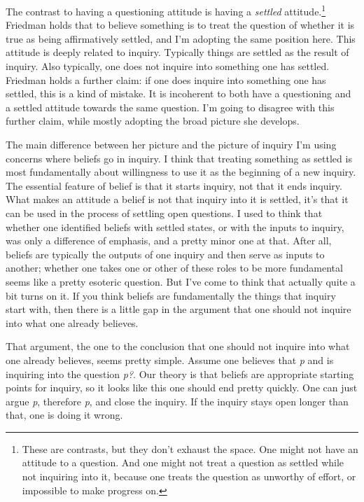 \documentclass[
  12pt,
  letterpaper,
]{scrbook}
\begin{document}
The contrast to having a questioning attitude is having a \emph{settled}
attitude.\footnote{These are contrasts, but they don't exhaust the
  space. One might not have an attitude to a question. And one might not
  treat a question as settled while not inquiring into it, because one
  treats the question as unworthy of effort, or impossible to make
  progress on.} Friedman holds that to believe something is to treat the
question of whether it is true as being affirmatively settled, and I'm
adopting the same position here. This attitude is deeply related to
inquiry. Typically things are settled as the result of inquiry. Also
typically, one does not inquire into something one has settled. Friedman
holds a further claim: if one does inquire into something one has
settled, this is a kind of mistake. It is incoherent to both have a
questioning and a settled attitude towards the same question. I'm going
to disagree with this further claim, while mostly adopting the broad
picture she develops.

The main difference between her picture and the picture of inquiry I'm
using concerns where beliefs go in inquiry. I think that treating
something as settled is most fundamentally about willingness to use it
as the beginning of a new inquiry. The essential feature of belief is
that it starts inquiry, not that it ends inquiry. What makes an attitude
a belief is not that inquiry into it is settled, it's that it can be
used in the process of settling open questions. I used to think that
whether one identified beliefs with settled states, or with the inputs
to inquiry, was only a difference of emphasis, and a pretty minor one at
that. After all, beliefs are typically the outputs of one inquiry and
then serve as inputs to another; whether one takes one or other of these
roles to be more fundamental seems like a pretty esoteric question. But
I've come to think that actually quite a bit turns on it. If you think
beliefs are fundamentally the things that inquiry start with, then there
is a little gap in the argument that one should not inquire into what
one already believes.

That argument, the one to the conclusion that one should not inquire
into what one already believes, seems pretty simple. Assume one believes
that \emph{p} and is inquiring into the question \emph{p?}. Our theory
is that beliefs are appropriate starting points for inquiry, so it looks
like this one should end pretty quickly. One can just argue \emph{p},
therefore \emph{p}, and close the inquiry. If the inquiry stays open
longer than that, one is doing it wrong.
\end{document}
